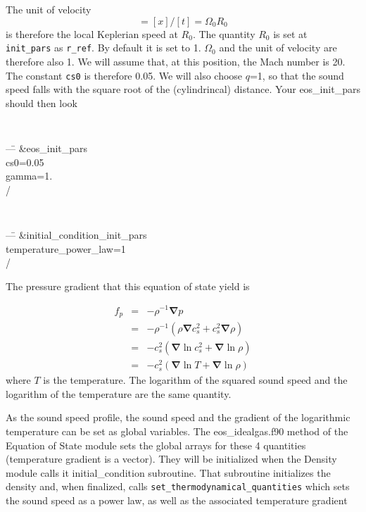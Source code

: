 \documentclass[a4paper,10pt]{article}
\renewcommand{\v}[1]{{\boldsymbol #1}} %
\newcommand{\del}{\v{\nabla}}
\newcommand{\grad}{\del}
\begin{document}
The unit of velocity 
\begin{equation}
[\v{u}]=[x]/[t]=\Omega_0 R_0
\end{equation}is therefore the local
Keplerian speed at $R_0$. The quantity $R_0$ is set at {\tt
  init\_pars} as {\tt r\_ref}. By default it is set to 1. $\Omega_0$ and the unit of velocity are therefore also 1. We will assume that, at this position, the Mach number is 20. The constant {\tt cs0} is therefore 0.05. We will also choose $q$=1, so that the sound speed falls with the square root of the (cylindrincal) distance. Your eos\_init\_pars should then look

{\tt 
\begin{tabbing}
  ---\=\kill
\&eos\_init\_pars\\
  \>cs0=0.05\\
  \>gamma=1.\\
/
\end{tabbing}
}

{\tt 
\begin{tabbing}
  ---\=\kill
\&initial\_condition\_init\_pars\\
  \> temperature\_power\_law=1\\
/
\end{tabbing}
}

The pressure gradient that this equation of state yield is 

\begin{eqnarray}
f_p&=&-\rho^{-1} \grad{p} \\
   &=& -\rho^{-1}\left(\rho \grad{c_s^2} + c_s^2\grad{\rho}\right)\\
   &=&  -c_s^2\left(\grad{\ln c_s^2} + \grad{\ln \rho}\right)  \\
   &=& -c_s^2\left(\grad{\ln T} + \grad{\ln \rho}\right)   \nonumber
\end{eqnarray}where $T$ is the temperature. The logarithm of the squared sound speed and the logarithm of the temperature are the same quantity.


As the sound speed profile, the sound speed and the gradient of the
logarithmic temperature can be set as global variables. The
eos\_idealgas.f90 method of the Equation of State module sets the
global arrays for these 4 quantities (temperature gradient is a
vector). They will be initialized when the Density module calls it
initial\_condition subroutine. That subroutine initializes the density
and, when finalized, calls {\tt set\_thermodynamical\_quantities}
which sets the sound speed as a power law, 
as well as the associated temperature gradient
\end{document}
